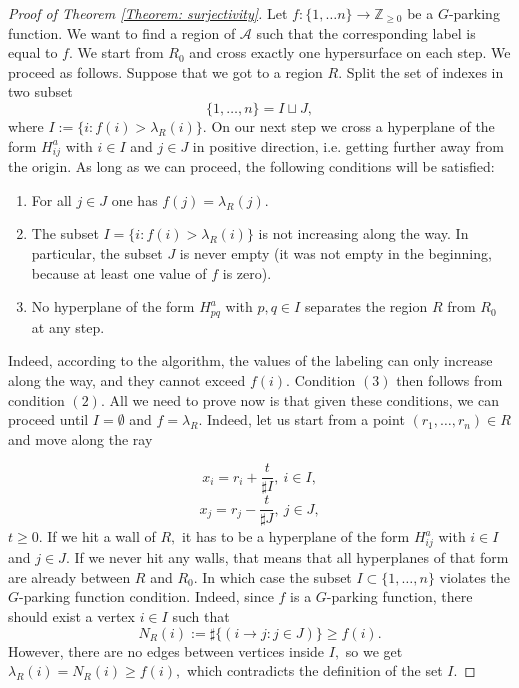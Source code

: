 \documentclass[12pt]{amsart}
\theoremstyle{definition}
\begin{document}
\begin{proof}[Proof of Theorem \ref{Theorem: surjectivity}]
Let $f:\{1,\ldots n\}\to \mathbb Z_{\ge 0}$ be a $G$-parking function. We want to find a region of ${\mathcal A}$ such that the corresponding label is equal to $f.$ We start from $R_0$ and cross exactly one hypersurface on each step. We proceed as follows. Suppose that we got to a region $R.$ Split the set of indexes in two subset 
$$
\{1,\ldots,n\}=I\sqcup J,
$$ 
where $I:=\{i:f(i)>\lambda_R(i)\}.$ On our next step we cross a hyperplane of the form $H_{ij}^a$ with $i\in I$ and $j\in J$ in positive direction, i.e. getting further away from the origin. As long as we can proceed, the following conditions will be satisfied:

\begin{enumerate}
\item For all $j\in J$ one has $f(j)=\lambda_R(j).$
\item The subset $I=\{i:f(i)>\lambda_R(i)\}$ is not increasing along the way. In particular, the subset $J$ is never empty (it was not empty in the beginning, because at least one value of $f$ is zero).
\item No hyperplane of the form $H_{pq}^a$ with $p,q\in I$ separates the region $R$ from $R_0$ at any step.
\end{enumerate}

Indeed, according to the algorithm, the values of the labeling can only increase along the way, and they cannot exceed $f(i).$ Condition $(3)$ then follows from condition $(2).$ All we need to prove now is that given these conditions, we can proceed until $I=\emptyset$ and $f=\lambda_R.$ Indeed, let us start from a point $(r_1,\ldots,r_n)\in R$ and move along the ray 

$$
x_i=r_i+\frac{t}{\sharp I},\ i\in I, 
$$
$$
x_j=r_j-\frac{t}{\sharp J},\ j\in J,
$$
$t\ge 0.$ If we hit a wall of $R,$ it has to be a hyperplane of the form $H_{ij}^a$ with $i\in I$ and $j\in J.$ If we never hit any walls, that means that all hyperplanes of that form are already between $R$ and $R_0.$ In which case the subset $I\subset\{1,\ldots,n\}$ violates the $G$-parking function condition. Indeed, since $f$ is a $G$-parking function, there should exist a vertex $i\in I$ such that 
$$
N_R(i):=\sharp\{(i\rightarrow j: j\in J)\}\ge f(i).
$$ 
However, there are no edges between vertices inside $I,$ so we get $\lambda_R(i)=N_R(i)\ge f(i),$ which contradicts the definition of the set $I.$  
\end{proof}
\end{document}
